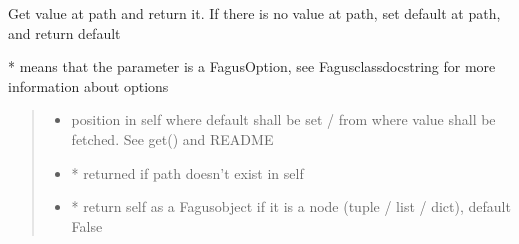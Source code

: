 \documentclass[a4paper,10pt,english]{sphinxmanual}
\begin{document}
\begin{fulllineitems}
\begin{fulllineitems}
\label{\detokenize{fagus:fagus.Fagus.setdefault}}
\pysigstartsignatures
{}
\pysigstopsignatures
\sphinxAtStartPar
Get value at path and return it. If there is no value at path, set default at path, and return default

\sphinxAtStartPar
* means that the parameter is a FagusOption, see Fagus\sphinxhyphen{}class\sphinxhyphen{}docstring for more information about options
\begin{quote}\begin{description}
\begin{itemize}
\item {}
\sphinxAtStartPar
{} \textendash{} position in self where default shall be set / from where value shall be fetched. See get() and README

\item {}
\sphinxAtStartPar
{} \textendash{} * returned if path doesn’t exist in self

\item {}
\sphinxAtStartPar
{} \textendash{} * return self as a Fagus\sphinxhyphen{}object if it is a node (tuple / list / dict), default False


\end{itemize}
\end{description}
\end{quote}
\end{fulllineitems}
\end{fulllineitems}
\end{document}
